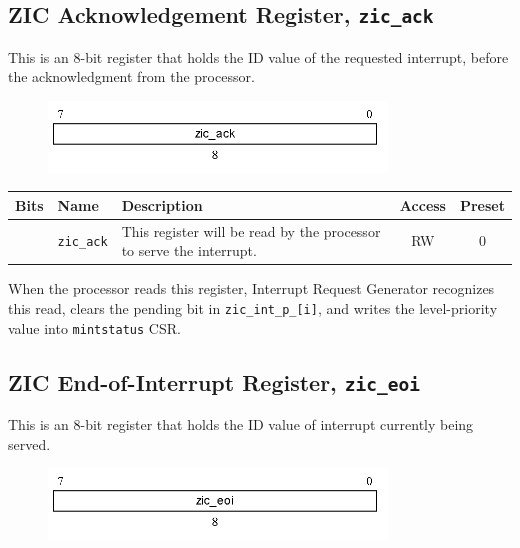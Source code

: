 \subsection{ZIC Acknowledgement Register, \texttt{zic\_ack}}
\label{subsec:zic-ack}
This is an 8-bit register that holds the ID value of the requested interrupt, before the acknowledgment from the processor.

\vspace{0.5cm}
\begin{figure}[H]
    \centering
    \includegraphics[width = 9cm]{images/zic_ack.png}
    \label{fig:zic_ack}
\end{figure}
\vspace{0.25cm}

\vspace{0.5cm}
\begin{table}[H]
    \label{tab:zic_ack}
        \centering
        \begin{tabular}{l l p{8cm} c c}
         \hline 
         \textbf{Bits} & \textbf{Name} & \textbf{Description} & \textbf{Access} & \textbf{Preset}\\ \hline \hline
         [7:0] & \texttt{zic\_ack} & This register will be read by the processor to serve the interrupt. & RW & 0\\ \hline
        \end{tabular}
\end{table}
\vspace{0.5cm}

 When the processor reads this register, Interrupt Request Generator recognizes this read, clears the pending bit in \texttt{zic\_int\_p\_[i]}, and writes the level-priority value into \texttt{mintstatus} CSR.

\subsection{ZIC End-of-Interrupt Register, \texttt{zic\_eoi}}
\label{subsec:zic-eoi}
This is an 8-bit register that holds the ID value of interrupt currently being served.

\vspace{0.5cm}
\begin{figure}[H]
    \centering
    \includegraphics[width = 9cm]{images/zic_eoi.png}
    \label{fig:zic_eoi}
\end{figure}
\vspace{0.25cm}

